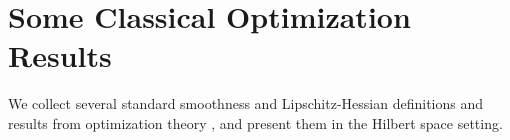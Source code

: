 \documentclass{article}
\theoremstyle{plain}
\theoremstyle{definition}
\theoremstyle{remark}
\begin{document}

\clearpage



\section{Some Classical Optimization Results}\label{app:SmoothnessLemmas}

We collect several standard smoothness and Lipschitz-Hessian definitions and results from optimization theory \cite{2006CubicRegularizationOfNewtonMethodAndItsGlobalPerformance,2018LecturesOnConvexOptimization}, and present them in the Hilbert space setting.
\end{document}
